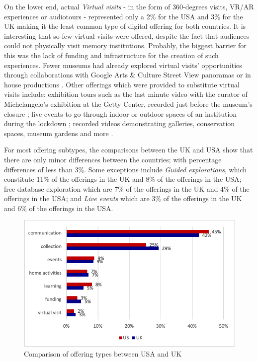 \documentclass{egpubl}
\begin{document}
On the lower end, actual \textit{Virtual visits} - in the form of 360-degrees visits, VR/AR experiences or audiotours - represented only a 2\% for the USA and 3\% for the UK making it the least common type of digital offering for both countries. It is interesting that so few virtual visits were offered, despite the fact that audiences could not physically visit memory institutions. Probably, the biggest barrier for this was the lack of funding and infrastructure for the creation of such experiences. Fewer museums had already explored virtual visits' opportunities through collaborations with Google Arts \& Culture Street View panoramas \cite{GoogleArtsCulture,GoogleArtsCulturea} or in house productions \cite{FrankLloydWrightFoundation,BirminghamMuseumArtGallery}. Other offerings which were provided to substitute virtual visits include: exhibition tours such as the last minute video with the curator of Michelangelo's exhibition at the Getty Center, recorded just before the museum's closure \cite{getty2020}; live events to go through indoor or outdoor spaces of an institution during the lockdown \cite{VizcayaMuseumGardens}; recorded videos demonstrating galleries, conservation spaces, museum gardens and more \cite{Kew2020,ArchaeologyAlexandria2020}.
 

For most offering subtypes, the comparisons between the UK and USA show that there are only minor differences between the countries; with percentage differences of less than 3\%. Some exceptions include \emph{Guided explorations}, which constitute 11\% of the offerings in the UK and 8\% of the offerings in the USA; free database exploration which are 7\% of the offerings in the UK and 4\% of the offerings in the USA; and \emph{Live events} which are 3\% of the offerings in the UK and 6\% of the offerings in the USA.
 
\begin{figure}[h]
  \centering
  \includegraphics[width=\linewidth]{images/typeNEW.png}
  \caption{\label{fig:TypeComparisonUKUS}
           Comparison of offering types between USA and UK}
\end{figure}
\end{document}
